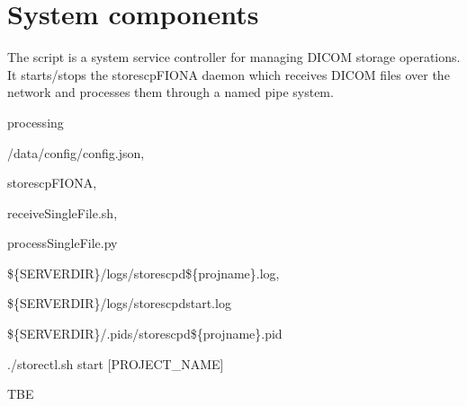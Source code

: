 \documentclass[letterpaper,10pt,english]{sphinxmanual}
\begin{document}
\sphinxstepscope


\section{System components}
\label{\detokenize{Architecture/scripts:system-components}}\label{\detokenize{Architecture/scripts::doc}}
\sphinxstepscope

\sphinxAtStartPar
The  script is a system service controller for managing DICOM storage operations. It starts/stops the storescpFIONA daemon which receives DICOM files over the network and processes them through a named pipe system.

\sphinxAtStartPar
{}

\begin{DUlineblock}{0em}
\item[] \sphinxhyphen{}  processing
\item[] \sphinxhyphen{} 
\item[]
\begin{DUlineblock}{\DUlineblockindent}
\item[] \sphinxhyphen{} /data/config/config.json,
\item[] \sphinxhyphen{} storescpFIONA,
\item[] \sphinxhyphen{} receiveSingleFile.sh,
\item[] \sphinxhyphen{} processSingleFile.py
\end{DUlineblock}
\item[] \sphinxhyphen{} 
\item[]
\begin{DUlineblock}{\DUlineblockindent}
\item[] \sphinxhyphen{} \$\{SERVERDIR\}/logs/storescpd\$\{projname\}.log,
\item[] \sphinxhyphen{} \$\{SERVERDIR\}/logs/storescpd\sphinxhyphen{}start.log
\end{DUlineblock}
\item[] \sphinxhyphen{}  \$\{SERVERDIR\}/.pids/storescpd\$\{projname\}.pid
\item[] \sphinxhyphen{}  ./storectl.sh start {[}PROJECT\_NAME{]}
\item[] \sphinxhyphen{}  TBE
\end{DUlineblock}
\end{document}
